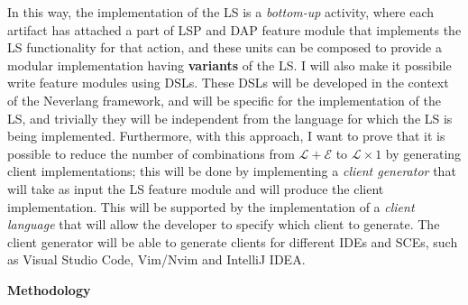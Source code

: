 In this way, the implementation of the LS is a \textit{bottom-up} activity, where each artifact has attached a part of LSP and DAP feature module that implements the LS functionality for that action, and these units can be composed to provide a modular implementation having \textbf{variants} of the LS.
I will also make it possibile write feature modules using DSLs.
These DSLs will be developed in the context of the Neverlang framework, and will be specific for the implementation of the LS, and trivially they will be independent from the language for which the LS is being implemented.
Furthermore, with this approach, I want to prove that it is possible to reduce the number of combinations from $\mathcal{L} + \mathcal{E}$ to $\mathcal{L} \times 1$ by generating client implementations; this will be done by implementing a \textit{client generator} that will take as input the LS feature module and will produce the client implementation. This will be supported by the implementation of a \textit{client language} that will allow the developer to specify which client to generate. The client generator will be able to generate clients for different IDEs and SCEs, such as Visual Studio Code, Vim/Nvim and IntelliJ IDEA.

\hfill \break
\noindent
\textbf{Methodology}

